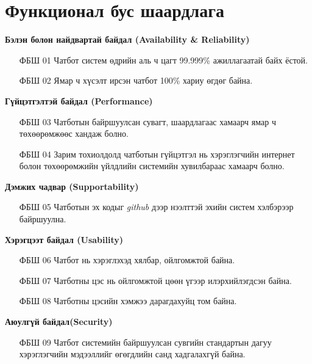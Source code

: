 \section{Функционал бус шаардлага}
\quad\textbf{Бэлэн болон найдвартай байдал (Availability \& Reliability)}
\begin{itemize}
  \item[ФБШ 01] Чатбот систем өдрийн аль ч цагт 99.999\% ажиллагаатай байх ёстой.
  \item[ФБШ 02] Ямар ч хүсэлт ирсэн чатбот 100\% хариу өгдөг байна. 
\end{itemize}
\quad\quad\textbf{Гүйцэтгэлтэй байдал (Performance)}
\begin{itemize}
  \item[ФБШ 03] Чатботын байршуулсан сувагт, шаардлагаас хамаарч ямар ч төхөөрөмжөөс хандаж болно.
  \item[ФБШ 04] Зарим тохиолдолд чатботын гүйцэтгэл нь хэрэглэгчийн интернет болон төхөөрөмжийн үйлдлийн системийн хувилбараас хамаарч болно.
\end{itemize}
\quad\quad\textbf{Дэмжих чадвар (Supportability)}
\begin{itemize}
  \item[ФБШ 05] Чатботын эх кодыг \textit{github} дээр нээлттэй эхийн систем хэлбэрээр байршуулна.
\end{itemize}
\quad\quad\textbf{Хэрэгцээт байдал (Usability)}
\begin{itemize}
  \item[ФБШ 06] Чатбот нь хэрэглэхэд хялбар, ойлгомжтой байна.
  \item[ФБШ 07] Чатботны цэс нь ойлгомжтой цөөн үгээр илэрхийлэгдсэн байна. 
  \item[ФБШ 08] Чатботны цэсийн хэмжээ дарагдахуйц том байна.
\end{itemize}
\quad\quad\textbf{Аюулгүй байдал(Security)}
\begin{itemize}
  \item[ФБШ 09] Чатбот системийн байршуулсан сувгийн стандартын дагуу хэрэглэгчийн мэдээллийг өгөгдлийн санд хадгалахгүй байна.  
\end{itemize}

